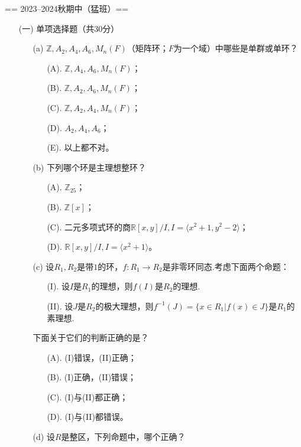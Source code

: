 == 2023--2024秋期中（猛班）==
\begin{itemize}
    \item[(一)]单项选择题（共30分）
    \begin{itemize}
        \item[(a)]$\mathbb{Z},A_2,A_4,A_6,M_n(F)$（矩阵环；$F$为一个域）中哪些是单群或单环？
        \begin{itemize}
            \item[(A).]$\mathbb{Z},A_4,A_6,M_n(F)$；
            \item[(B).]$\mathbb{Z},A_2,A_6,M_n(F)$；
            \item[(C).]$\mathbb{Z},A_2,A_4,M_n(F)$；
            \item[(D).]$A_2,A_4,A_6$；
            \item[(E).]以上都不对。
        \end{itemize}
        \item[(b)]下列哪个环是主理想整环？
        \begin{itemize}
            \item[(A).]$\mathbb{Z}_{25}$；
            \item[(B).]$\mathbb{Z}[x]$；
            \item[(C).]二元多项式环的商$\mathbb{R}[x,y]/I,I=\langle x^2+1,y^2-2\rangle$；
            \item[(D).]$\mathbb{R}[x,y]/I,I=\langle x^2+1\rangle$。
        \end{itemize}
        \item[(c)]设$R_1,R_2$是带$1$的环，$f:R_1\to R_2$是非零环同态.考虑下面两个命题：
        \begin{itemize}
            \item[(I).]设$I$是$R_1$的理想，则$f(I)$是$R_2$的理想.
            \item[(II).]设$J$是$R_2$的极大理想，则$f^{-1}(J)=\{x\in R_1|f(x)\in J\}$是$R_1$的素理想.
        \end{itemize}
        下面关于它们的判断$\textbf{正确}$的是？
        \begin{itemize}
            \item[(A).](I)错误，(II)正确；
            \item[(B).](I)正确，(II)错误；
            \item[(C).](I)与(II)都正确；
            \item[(D).](I)与(II)都错误。
        \end{itemize}
        \item[(d)]设$R$是整区，下列命题中，哪个$\textbf{正确}$？

\end{itemize}
\end{itemize}
